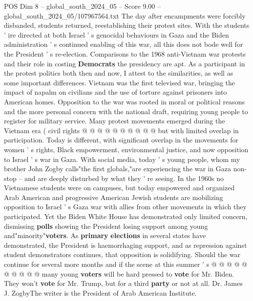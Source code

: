 \begin{textsample}{POS Dim 8 – global\_south\_2024\_05 – Score 9.00 – global\_south\_2024\_05/107967564.txt}
The day after encampments were forcibly disbanded, students returned, reestablishing their protest sites.
With the students ' ire directed at both Israel ' s genocidal behaviours in Gaza and the Biden administration ' s continued enabling of this war, all this does not bode well for the President ' s re-election.
Comparisons to the 1968 anti-Vietnam war protests and their role in costing \textbf{Democrats} the presidency are apt.
As a participant in the protest politics both then and now, I attest to the similarities, as well as some important differences.
Vietnam was the first televised war, bringing the impact of napalm on civilians and the use of torture against prisoners into American homes.
Opposition to the war was rooted in moral or political reasons and the more personal concern with the national draft, requiring young people to register for military service.
Many protest movements emerged during the Vietnam era ( civil rights @ @ @ @ @ @ @ @ @ @ but with limited overlap in participation.
Today is different, with significant overlap in the movements for women ' s rights, Black empowerment, environmental justice, and now opposition to Israel ' s war in Gaza.
With social media, today ' s young people, whom my brother John Zogby calls"the first globals,"are experiencing the war in Gaza non-stop -- and are deeply disturbed by what they ' re seeing.
In the 1960s no Vietnamese students were on campuses, but today empowered and organized Arab American and progressive American Jewish students are mobilizing opposition to Israel ' s Gaza war with allies from other movements in which they participated.
Yet the Biden White House has demonstrated only limited concern, dismissing \textbf{polls} showing the President losing support among young and"minority"\textbf{voters}.
As \textbf{primary} \textbf{elections} in several states have demonstrated, the President is haemorrhaging support, and as repression against student demonstrators continues, that opposition is solidifying.
Should the war continue for several more months and if the scene at this summer ' s @ @ @ @ @ @ @ @ @ @ many young \textbf{voters} will be hard pressed to \textbf{vote} for Mr.
Biden.
They won't \textbf{vote} for Mr.
Trump, but for a third \textbf{party} or not at all.
Dr.
James J.
ZogbyThe writer is the President of Arab American Institute.

\end{textsample}
